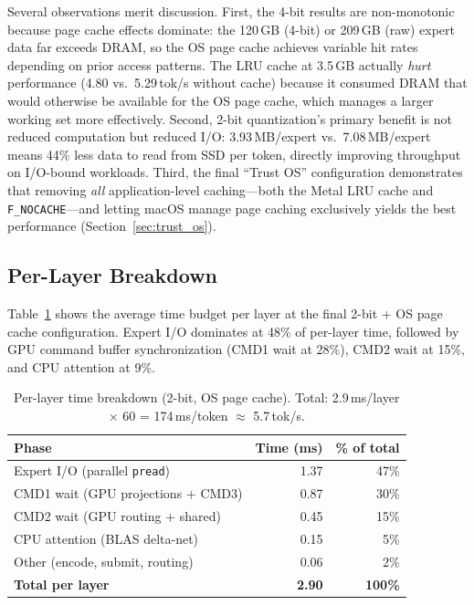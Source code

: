 \documentclass[11pt,twocolumn]{article}
\begin{document}
Several observations merit discussion.
First, the 4-bit results are non-monotonic because page cache effects dominate: the 120\,GB (4-bit) or 209\,GB (raw) expert data far exceeds DRAM, so the OS page cache achieves variable hit rates depending on prior access patterns.
The LRU cache at 3.5\,GB actually \emph{hurt} performance (4.80 vs.\ 5.29\,tok/s without cache) because it consumed DRAM that would otherwise be available for the OS page cache, which manages a larger working set more effectively.
Second, 2-bit quantization's primary benefit is not reduced computation but reduced I/O: 3.93\,MB/expert vs.\ 7.08\,MB/expert means 44\% less data to read from SSD per token, directly improving throughput on I/O-bound workloads.
Third, the final ``Trust OS'' configuration demonstrates that removing \emph{all} application-level caching---both the Metal LRU cache and \texttt{F\_NOCACHE}---and letting macOS manage page caching exclusively yields the best performance (Section~\ref{sec:trust_os}).

\subsection{Per-Layer Breakdown}

Table~\ref{tab:breakdown} shows the average time budget per layer at the final 2-bit + OS page cache configuration.
Expert I/O dominates at 48\% of per-layer time, followed by GPU command buffer synchronization (CMD1 wait at 28\%), CMD2 wait at 15\%, and CPU attention at 9\%.

\begin{table}[h!]
\centering
\caption{Per-layer time breakdown (2-bit, OS page cache). Total: 2.9\,ms/layer $\times$ 60 = 174\,ms/token $\approx$ 5.7\,tok/s.}
\label{tab:breakdown}
\begin{tabular}{lrr}
\toprule
\textbf{Phase} & \textbf{Time (ms)} & \textbf{\% of total} \\
\midrule
Expert I/O (parallel \texttt{pread}) & 1.37 & 47\% \\
CMD1 wait (GPU projections + CMD3) & 0.87 & 30\% \\
CMD2 wait (GPU routing + shared) & 0.45 & 15\% \\
CPU attention (BLAS delta-net) & 0.15 & 5\% \\
Other (encode, submit, routing) & 0.06 & 2\% \\
\midrule
\textbf{Total per layer} & \textbf{2.90} & \textbf{100\%} \\
\bottomrule
\end{tabular}
\end{table}
\end{document}
